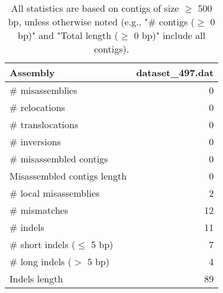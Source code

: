 \documentclass[12pt,a4paper]{article}
\begin{document}
\begin{table}[ht]
\begin{center}
\caption{All statistics are based on contigs of size $\geq$ 500 bp, unless otherwise noted (e.g., "\# contigs ($\geq$ 0 bp)" and "Total length ($\geq$ 0 bp)" include all contigs).}
\begin{tabular}{|l*{1}{|r}|}
\hline
Assembly & dataset\_497.dat \\ \hline
\# misassemblies & 0 \\ \hline
\hspace{5mm}\# relocations & 0 \\ \hline
\hspace{5mm}\# translocations & 0 \\ \hline
\hspace{5mm}\# inversions & 0 \\ \hline
\# misassembled contigs & 0 \\ \hline
Misassembled contigs length & 0 \\ \hline
\# local misassemblies & 2 \\ \hline
\# mismatches & 12 \\ \hline
\# indels & 11 \\ \hline
\hspace{5mm}\# short indels ($\leq$ 5 bp) & 7 \\ \hline
\hspace{5mm}\# long indels ($>$ 5 bp) & 4 \\ \hline
Indels length & 89 \\ \hline
\end{tabular}
\end{center}
\end{table}
\end{document}
